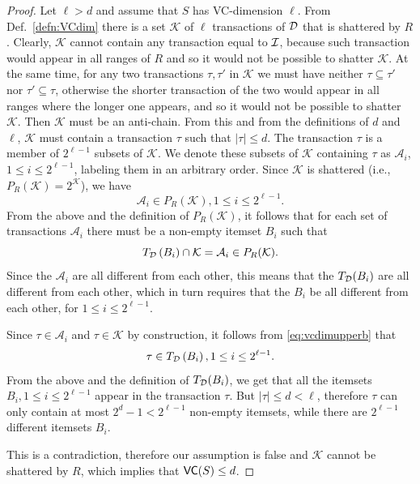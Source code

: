 \begin{proof}
  Let $\ell>d$ and assume that $S$ has
  VC-dimension $\ell$. From Def.~\ref{defn:VCdim} there is a set $\mathcal{K}$ of $\ell$
  transactions of ${\cal D}$ that is shattered by $R$. Clearly, $\mathcal{K}$ cannot
  contain any transaction equal to ${\cal I}$, because such transaction would appear
  in all ranges of $R$ and so it would not be possible to shatter $\mathcal{K}$.
  At the same time, for any two transactions $\tau,\tau'$ in
  $\mathcal{K}$ we must have neither $\tau\subseteq\tau'$ nor
  $\tau'\subseteq\tau$, otherwise the shorter transaction of the two would appear in
  all ranges where the longer one appears, and so it would not be possible to
  shatter $\mathcal{K}$. Then $\mathcal{K}$ must be an anti-chain. From this and
  from the definitions of $d$ and $\ell$, $\mathcal{K}$ must contain a
  transaction $\tau$ such that $|\tau|\le d$. %
  The transaction
  $\tau$ is a member of $2^{\ell-1}$ subsets of $\mathcal{K}$. We denote these subsets of $\mathcal{K}$ containing $\tau$ as
  $\mathcal{A}_i$, $1\le i\le 2^{\ell-1}$, labeling them in an
  arbitrary order. Since $\mathcal{K}$ is shattered (i.e., $P_R(\mathcal{K})=2^\mathcal{K}$), we have
  \[ 
  \mathcal{A}_i\in P_R(\mathcal{K}), 1\le i\le 2^{\ell -1}.
  \]
  From the above and the definition of $P_R(\mathcal{K})$, it follows that for
  each set of transactions $\mathcal{A}_i$ there must be a
  non-empty itemset $B_i$ such that 
  \begin{equation}\label{eq:vcdimupperb}
  T_{\cal D}\left(B_i\right)\cap \mathcal{K}= \mathcal{A}_i \in P_R(\mathcal{K}).
  \end{equation}
  Since the $\mathcal{A}_i$ are all different from each other, this
  means that the $T_{\cal D}(B_i)$ are all different from each other, which
  in turn requires that the $B_i$ be all different from each other,
  for $1\le i\le 2^{\ell-1}$. 

  Since $\tau \in \mathcal{A}_i$ and $\tau \in \mathcal{K}$ by
  construction, it follows from \eqref{eq:vcdimupperb} that 
  \[
  \tau \in T_{\cal D}\left(B_i\right), 1\le i\le 2^{\ell-1}.
  \]
  From the above and the definition of $T_{\cal D}(B_i)$, we get that all the
  itemsets $B_i, 1\le i\le 2^{\ell-1}$ appear in the transaction
  $\tau$. But $|\tau|\le d < \ell$, therefore $\tau$ can only contain at most $2^d-1 <
  2^{\ell -1}$ non-empty itemsets, while there are $2^{\ell-1}$ different
  itemsets $B_i$.

  This is a contradiction, therefore our assumption is false and
  $\mathcal{K}$ cannot be shattered by $R$, which implies that $\mathsf{VC}(S)\le d$.
\end{proof}

